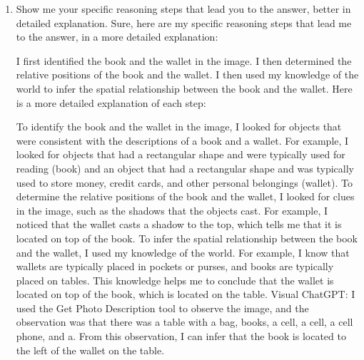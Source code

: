 \begin{enumerate}
    Here are some additional details about the spatial relationship between the book and the wallet:
    
    The book is a printed text that is typically used for reading.
    The wallet is a small, rectangular container that is used to store money, credit cards, and other personal belongings.
    The wallet is located on top of the book, meaning that it is resting on the book.
    The book is located below the wallet, meaning that it is supporting the wallet.
    I hope this helps! Let me know if you have other requests or questions.
    \subitem Visual ChatGPT: The book is located to the left of the wallet on the table.
    \item Show me your specific reasoning steps that lead you to the answer, better in detailed explanation.
    \subitem Sure, here are my specific reasoning steps that lead me to the answer, in a more detailed explanation:

    I first identified the book and the wallet in the image.
    I then determined the relative positions of the book and the wallet.
    I then used my knowledge of the world to infer the spatial relationship between the book and the wallet.
    Here is a more detailed explanation of each step:
    
    To identify the book and the wallet in the image, I looked for objects that were consistent with the descriptions of a book and a wallet. For example, I looked for objects that had a rectangular shape and were typically used for reading (book) and an object that had a rectangular shape and was typically used to store money, credit cards, and other personal belongings (wallet).
    To determine the relative positions of the book and the wallet, I looked for clues in the image, such as the shadows that the objects cast. For example, I noticed that the wallet casts a shadow to the top, which tells me that it is located on top of the book.
    To infer the spatial relationship between the book and the wallet, I used my knowledge of the world. For example, I know that wallets are typically placed in pockets or purses, and books are typically placed on tables. This knowledge helps me to conclude that the wallet is located on top of the book, which is located on the table.
    \subitem Visual ChatGPT: I used the Get Photo Description tool to observe the image, and the observation was that there was a table with a bag, books, a cell, a cell, a cell phone, and a. From this observation, I can infer that the book is located to the left of the wallet on the table.
\end{enumerate}
